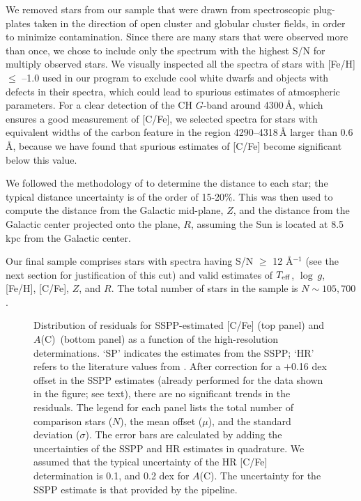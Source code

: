 \documentclass[iop]{emulateapj}
\newcommand*{\ac}{$A$(C)}
\newcommand*{\teff}{$T_{\rm eff}$}
\newcommand*{\logg}{$\log~g$}
\newcommand*{\feh}{[Fe/H]}
\newcommand*{\cfe}{[C/Fe]}
\begin{document}
We removed stars from our sample that were drawn from spectroscopic
plug-plates taken in the direction of open cluster and globular cluster
fields, in order to minimize contamination. Since there are many stars
that were observed more than once, we chose to include only 
the spectrum with the highest S/N for multiply observed
stars. We visually inspected all the spectra of stars with [Fe/H]
$\le$ --1.0 used in our program to exclude cool white dwarfs and objects
with defects in their spectra, which could lead to spurious estimates of 
atmospheric parameters. For a clear detection of the CH $G$-band around
4300\,{\AA}, which ensures a good measurement of [C/Fe], we selected
spectra for stars with equivalent widths of the carbon feature in the
region 4290--4318\,{\AA} larger than 0.6\,{\AA}, because we have found that
spurious estimates of [C/Fe] become significant below this value.

We followed the methodology of \citet{beers2000, beers2012} to determine
the distance to each star; the typical distance uncertainty is of the
order of 15-20\%. This was then used to compute the distance from the
Galactic mid-plane, $Z$, and the distance from the Galactic center
projected onto the plane, $R$, assuming the Sun is located at 8.5 kpc
from the Galactic center.

Our final sample comprises stars with spectra having S/N $\ge$ 12
\AA$^{-1}$ (see the next section for justification of this cut) and
valid estimates of \teff, \logg, \feh, \cfe, $Z$, and $R$. The total
number of stars in the sample is $N \sim 105,700$.


\begin{figure}[t]
\centering
{}
\caption{Distribution of residuals for SSPP-estimated [C/Fe] (top panel)
and \ac\ (bottom panel) as a function of the high-resolution
determinations. `SP' indicates the estimates from the SSPP; `HR' refers
to the literature values from \citet{yoon2016}. After correction for a
$+$0.16 dex offset in the SSPP estimates (already performed for the data
shown in the figure; see text), there are no significant trends in the
residuals. The legend for each panel lists the total number of
comparison stars ($N$), the mean offset ($\mu$), and the standard
deviation ($\sigma$). The error bars are calculated by adding the
uncertainties of the SSPP and HR estimates in quadrature. We assumed
that the typical uncertainty of the HR [C/Fe] determination is 0.1,
and 0.2 dex for \ac. The uncertainty for the SSPP estimate is that
provided by the pipeline.}
\label{fig:ccheck}
\end{figure}
\end{document}
